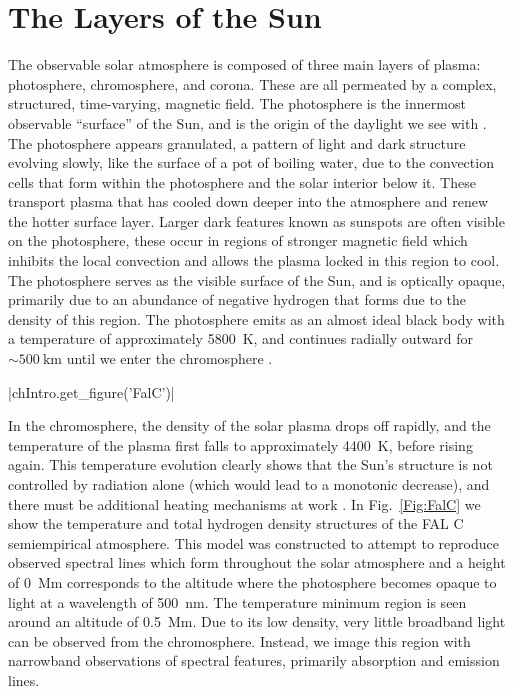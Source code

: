\section{The Layers of the Sun}

The observable solar atmosphere is composed of three main layers of plasma: photosphere, chromosphere, and corona.
These are all permeated by a complex, structured, time-varying, magnetic field.
The photosphere is the innermost observable ``surface'' of the Sun, and is the origin of the daylight we see with \citep{Zirin1992}.
The photosphere appears granulated, a pattern of light and dark structure evolving slowly, like the surface of a pot of boiling water, due to the convection cells that form within the photosphere and the solar interior below it.
These transport plasma that has cooled down deeper into the atmosphere and renew the hotter surface layer.
Larger dark features known as sunspots are often visible on the photosphere, these occur in regions of stronger magnetic field which inhibits the local convection and allows the plasma locked in this region to cool.
The photosphere serves as the visible surface of the Sun, and is optically opaque, primarily due to an abundance of negative hydrogen that forms due to the density of this region.
The photosphere emits as an almost ideal black body with a temperature of approximately \SI{5800}{\kelvin}, and continues radially outward for $\sim\SI{500}{\kilo\metre}$ until we enter the chromosphere \citep{Carroll2007}.

\py[Intro]|chIntro.get_figure('FalC')|

In the chromosphere, the density of the solar plasma drops off rapidly, and the temperature of the plasma first falls to approximately \SI{4400}{\kelvin}, before rising again.
This temperature evolution clearly shows that the Sun's structure is not controlled by radiation alone (which would lead to a monotonic decrease), and there must be additional heating mechanisms at work \citep{Gurman1992}.
In Fig.~\ref{Fig:FalC} we show the temperature and total hydrogen density structures of the FAL C semiempirical atmosphere.
This model was constructed to attempt to reproduce observed spectral lines which form throughout the solar atmosphere and a height of \SI{0}{\mega\m} corresponds to the altitude where the photosphere becomes opaque to light at a wavelength of \SI{500}{\nano\m}.
The temperature minimum region is seen around an altitude of \SI{0.5}{\mega\metre}.
Due to its low density, very little broadband light can be observed from the chromosphere.
Instead, we image this region with narrowband observations of spectral features, primarily absorption and emission lines.

